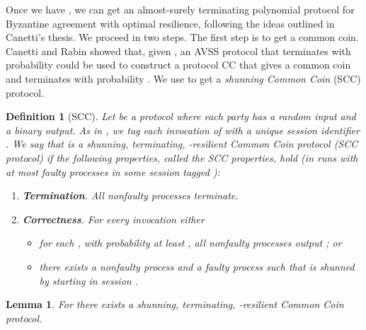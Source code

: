 \documentclass{sig-alternate}
\newtheorem{lemma}{Lemma}
\newtheorem{definition}{Definition}
\newcommand{\davss}{{\text{SVSS}}\xspace}
\begin{document}
Once we have \davss, we can get an almost-surely terminating polynomial
protocol for Byzantine agreement with optimal resilience, following the
ideas outlined in Canetti's \citeyear{Can-thesis} thesis.  We proceed
in two steps.
The first step is to get a common coin.  Canetti and Rabin
showed that, given , an AVSS protocol that terminates with
probability  could be used to construct a protocol
CC that gives a common coin and terminates with probability .
We use \davss to get a
\emph{shunning Common Coin} (SCC) protocol.
\begin{definition}[SCC]
Let  be a protocol where each party has a random input and a
binary output. As in \davss, we tag each invocation of  with a
unique session identifier .
We say that  is a \emph{shunning, terminating, -resilient
Common Coin protocol}
(SCC protocol)
if the  following properties,
called the \emph{SCC properties},
hold
(in runs with at most  faulty processes
in some session tagged 
):
\begin{enumerate}
\item \textbf{Termination}. All nonfaulty processes terminate.

\item \textbf{Correctness}. For every invocation either
    \begin{itemize}
        \item for each , with probability at least , all nonfaulty processes output ; or

        \item there exists a nonfaulty process  and a faulty process  such that  is shunned by  starting in session .
    \end{itemize}
\end{enumerate}	
\end{definition}

\begin{lemma}
For  there exists a shunning, terminating, -resilient Common Coin protocol.
\end{lemma}
\end{document}

